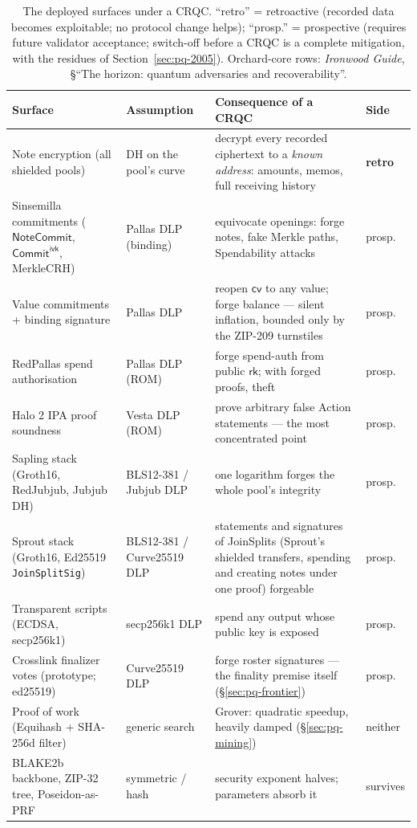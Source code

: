 \documentclass[11pt,a4paper]{article}
\theoremstyle{definition}
\newcommand{\cvsym}{\mathsf{cv}}
\newcommand{\rk}{\mathsf{rk}}
\newcommand{\NoteCommit}{\ensuremath{\mathsf{NoteCommit}}}
\newcommand{\CommitIvk}{\ensuremath{\mathsf{Commit}^{\mathsf{ivk}}}}
\begin{document}
\begin{table}[ht]
\centering
\footnotesize
\setlength{\tabcolsep}{4pt}
\begin{tabular}{@{}p{3.4cm}p{3.2cm}p{5.6cm}l@{}}
\toprule
Surface & Assumption & Consequence of a CRQC & Side \\
\midrule
Note encryption (all shielded pools) & DH on the pool's curve &
decrypt every recorded ciphertext to a \emph{known address}: amounts,
memos, full receiving history & \textbf{retro} \\
\addlinespace[2pt]
Sinsemilla commitments (\NoteCommit, \CommitIvk, MerkleCRH) & Pallas
DLP (binding) & equivocate openings: forge notes, fake Merkle paths,
Spendability attacks & prosp. \\
Value commitments + binding signature & Pallas DLP & reopen
$\cvsym$ to any value; forge balance --- silent inflation, bounded only
by the ZIP-209 turnstiles & prosp. \\
RedPallas spend authorisation & Pallas DLP (ROM) & forge spend-auth
from public $\rk$; with forged proofs, theft & prosp. \\
Halo 2 IPA proof soundness & Vesta DLP (ROM) & prove arbitrary false
Action statements --- the most concentrated point & prosp. \\
Sapling stack (Groth16, RedJubjub, Jubjub DH) & BLS12-381 / Jubjub
DLP & one logarithm forges the whole pool's integrity & prosp. \\
Sprout stack (Groth16, Ed25519 \texttt{JoinSplitSig}) & BLS12-381 /
Curve25519 DLP & statements and signatures of JoinSplits (Sprout's
shielded transfers, spending and creating notes under one proof)
forgeable & prosp. \\
Transparent scripts (ECDSA, secp256k1) & secp256k1 DLP & spend any
output whose public key is exposed & prosp. \\
Crosslink finalizer votes (prototype; ed25519) & Curve25519 DLP &
forge roster signatures --- the finality premise itself
(\S\ref{sec:pq-frontier}) & prosp. \\
\addlinespace[2pt]
Proof of work (Equihash + SHA-256d filter) & generic search & Grover:
quadratic speedup, heavily damped (\S\ref{sec:pq-mining}) & neither \\
BLAKE2b backbone, ZIP-32 tree, Poseidon-as-PRF & symmetric / hash &
security exponent halves; parameters absorb it & survives \\
\bottomrule
\end{tabular}
\caption{The deployed surfaces under a CRQC. ``retro'' = retroactive
(recorded data becomes exploitable; no protocol change helps);
``prosp.'' = prospective (requires future validator acceptance;
switch-off before a CRQC is a complete mitigation, with the residues of
Section~\ref{sec:pq-2005}). Orchard-core rows: \emph{Ironwood Guide},
\S``The horizon: quantum adversaries and recoverability''.}
\label{tab:pq-inventory}
\end{table}
\end{document}
